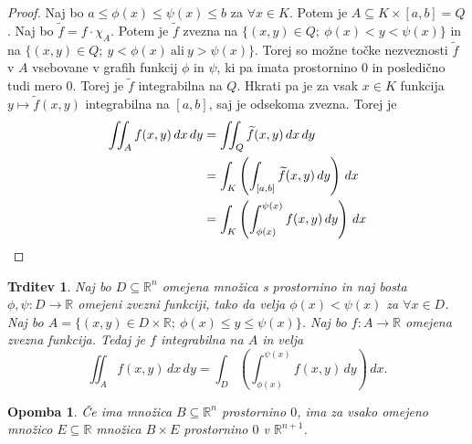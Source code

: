 \documentclass[10pt, a4paper]{article}
\newtheorem{trditev}[izr]{Trditev}
\newtheorem*{opomba}{Opomba}
\newenvironment{noticeC}{%
  \tcolorbox[%
  notitle,
  empty,
  enhanced,  %
  breakable,
  coltext=black, 
  fontupper=\rmfamily,
  parbox=false,
  noparskip,
  sharp corners,
  boxrule=-1pt,  %
  frame hidden,
  left=7pt,  %
  right=7pt,
  top=5pt,
  bottom=5pt,
  before skip=2.5ex plus 2pt,
  after skip=2.5ex plus 2pt,
  overlay unbroken and last={%
  },
  ]}
{\endtcolorbox}
\newenvironment{dokaz}%
  {\begin{noticeC}\begin{proof}}%
  {\end{proof}\end{noticeC}}
\newcommand{\R}{\mathbb {R}}
\begin{document}
\begin{dokaz}
    Naj bo $a \leq \phi(x) \leq \psi(x) \leq b$ za $\forall x \in K$.
    Potem je $A \subseteq K \times [a, b] = Q$.
    Naj bo $\widetilde{f} = f \cdot \chi_A$. Potem je $\widetilde{f}$ zvezna na 
    $\{(x, y) \in Q;\ \phi(x) < y < \psi(x)\}$ in na $\{(x, y) \in Q;\ y < \phi(x)\ \mathrm{ali}\ y > \psi(x)\}$.
    Torej so možne točke nezveznosti $\widetilde{f}$ v $A$ vsebovane v grafih funkcij $\phi$ in $\psi$,
    ki pa imata prostornino $0$ in posledično tudi mero $0$.
    Torej je $\widetilde{f}$ integrabilna na $Q$.
    Hkrati pa je za vsak $x \in K$ funkcija $y \mapsto \widetilde{f} (x, y)$ integrabilna na $[a, b]$, saj je odsekoma zvezna.
    Torej je
    \begin{align*}
        \iint_A f(x, y)\, dx\, dy &= \iint_Q \widetilde{f} (x, y)\, dx\, dy\\
        &= \int_K \left(\int_{[a, b]} \widetilde{f} (x, y)\, dy\right)\, dx\\
        &= \int_K \left(\int_{\phi(x)} ^{\psi(x)} f (x, y)\, dy\right)\, dx \qedhere
    \end{align*}
\end{dokaz}

\begin{trditev}
    Naj bo $D \subseteq \R^n$ omejena množica s prostornino in naj bosta $\phi, \psi: D \to \R$
    omejeni zvezni funkciji, tako da velja $\phi(x) < \psi (x)$ za $\forall x \in D$.
    Naj bo $A = \{(x, y) \in D \times \R;\ \phi(x) \leq y\leq \psi(x)\}$.
    Naj bo $f: A \to \R$ omejena zvezna funkcija.
    Tedaj je $f$ integrabilna na $A$ in velja 
    $$\iint _A f(x, y)\, dx\, dy = \int_D \left(\int_{\phi(x)} ^{\psi(x)} f(x, y)\, dy\right)\, dx.$$
\end{trditev}

\begin{opomba}
    Če ima množica $B \subseteq \R^n$ prostornino $0$, ima za vsako omejeno množico $E \subseteq \R$
    množica $B \times E$ prostornino $0$ v $\R^{n + 1}$.
\end{opomba}
\end{document}
